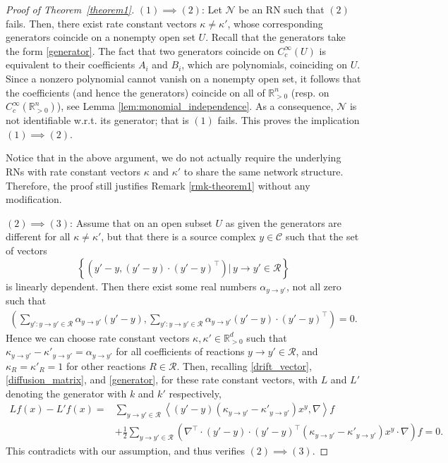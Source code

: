 \documentclass[10pt,a4paper]{amsart}
\def\R{\mathbb{R}}
\def\cC{\mathcal{C}}
\def\cN{\mathcal{N}}
\def\cR{\mathcal{R}}
\def\k{\kappa}
\begin{document}
\begin{proof}[Proof of Theorem~\ref{theorem1}]$(1)\implies (2)$: Let $\cN$ be an RN such that $(2)$ fails. Then, there exist rate constant vectors $\kappa \neq \kappa'$, whose corresponding generators coincide on a nonempty open set $U$. Recall that the generators take the form \eqref{generator}. The fact that two generators coincide on $C_c^{\infty} (U)$ is equivalent to their coefficients $A_i$ and $B_i$, which are polynomials, coinciding on $U$. Since a nonzero polynomial cannot vanish on a nonempty open set, it follows that the coefficients (and hence the generators) coincide on all of $\R^n_{>0}$ (resp. on $C^\infty_c(\mathbb{R}^n_{>0})$), see Lemma \ref{lem:monomial_independence}. As a consequence, $\cN$ is not identifiable w.r.t. its generator; that is $(1)$ fails. This proves the implication $(1) \implies (2)$.

Notice that in the above argument, we do not actually require the underlying RNs with rate constant vectors $\kappa$ and $\kappa'$ to share the same network structure. Therefore, the proof still justifies Remark \ref{rmk-theorem1} without any modification.


$(2) \implies (3)$: Assume that on an open subset $U$ as given the generators are different for all $\kappa \neq \kappa'$, but that there is a source complex $y \in \cC$ such that the set of vectors 
$$\left\{\left(y' - y,(y' - y)\cdot (y' - y)^{\intercal}\right) \big| \, y\to y'\in\cR\right\}$$
is linearly dependent. Then there exist some real numbers $\alpha_{y\to y'}$, not all zero  such that
\begin{align*}
\left(\sum_{y' \colon y \to y'\in\cR} \alpha_{y\to y'}(y' - y),\sum_{y' \colon y \to y'\in\cR} \alpha_{y\to y'} (y' - y)\cdot (y' - y)^{\intercal} \right)  
= 0.
\end{align*}
Hence we can choose rate constant vectors $\k,\k' \in \R^{d}_{>0}$ such that $\k_{y \to y'}- \k'_{y \to y'} = \alpha_{y \to y'}$ for all coefficients of reactions $y \to y'\in\cR$, and $\k_{R} = \k'_{R} = 1$ for other reactions $R \in\cR$. Then, recalling \eqref{drift_vector}, \eqref{diffusion_matrix}, and \eqref{generator}, for these rate constant vectors,
with $L$ and $L'$ denoting the generator with $k$ and $k'$ respectively,
\begin{align*}
 L f(x) - L' f(x) = & \sum_{y\to y'\in \cR} \left\langle (y' - y)(\k_{y\to y'}-\k'_{y\to y'})x^y, \nabla\right\rangle f \\ 
& + \frac{1}{2} \sum_{y\to y'\in \cR} \left(\nabla^{\intercal} \cdot (y' - y)\cdot(y' - y)^{\intercal}(\k_{y\to y'}-\k'_{y\to y'}) x^y \cdot \nabla \right) f  = 0.
\end{align*}
This contradicts with our assumption, and thus verifies $(2) \implies (3)$.


\end{proof}
\end{document}
